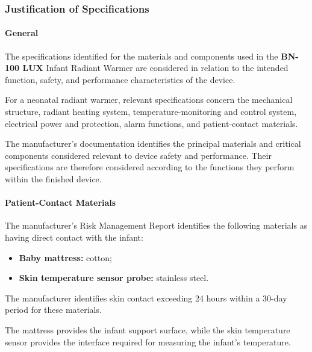 ﻿

\hypertarget{p3-2-3-5}{}

\subsubsection{Justification of Specifications}

\paragraph{General}

The specifications identified for the materials and components used
in the \textbf{BN-100 LUX} Infant Radiant Warmer are considered in
relation to the intended function, safety, and performance
characteristics of the device.

For a neonatal radiant warmer, relevant specifications concern the
mechanical structure, radiant heating system, temperature-monitoring
and control system, electrical power and protection, alarm functions,
and patient-contact materials.

The manufacturer's documentation identifies the principal materials
and critical components considered relevant to device safety and
performance. Their specifications are therefore considered according
to the functions they perform within the finished device.

\paragraph{Patient-Contact Materials}

The manufacturer's Risk Management Report identifies the following
materials as having direct contact with the infant:

\begin{itemize}
    \item \textbf{Baby mattress:} cotton;
    \item \textbf{Skin temperature sensor probe:} stainless steel.
\end{itemize}

The manufacturer identifies skin contact exceeding 24 hours within
a 30-day period for these materials.

The mattress provides the infant support surface, while the skin
temperature sensor provides the interface required for measuring
the infant's temperature.

